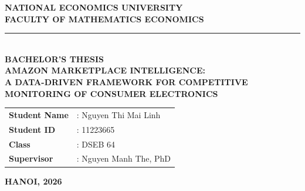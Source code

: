\documentclass[12pt, a4paper]{report}
\begin{document}
\begin{titlepage}
  \centering
  \textbf{NATIONAL ECONOMICS UNIVERSITY}\\
  \textbf{FACULTY OF MATHEMATICS ECONOMICS}\\[0.5cm]
  \rule{\linewidth}{0.5pt}\\[1.5cm]

  {\LARGE \textbf{BACHELOR'S THESIS}}\\[1.5cm]

  {\Large \textbf{AMAZON MARKETPLACE INTELLIGENCE:\\[0.3cm]
  A DATA-DRIVEN FRAMEWORK FOR COMPETITIVE\\[0.3cm]
  MONITORING OF CONSUMER ELECTRONICS}}\\[2cm]

  \begin{tabular}{ll}
    \textbf{Student Name}  & : Nguyen Thi Mai Linh \\[0.3cm]
    \textbf{Student ID}    & : 11223665 \\[0.3cm]
    \textbf{Class}         & : DSEB 64 \\[0.3cm]
    \textbf{Supervisor}    & : Nguyen Manh The, PhD \\
  \end{tabular}

  \vfill
  {\large \textbf{HANOI, 2026}}
\end{titlepage}

\pagestyle{plain}





\tableofcontents
\listoffigures
\listoftables



\pagestyle{fancy}










\end{document}
